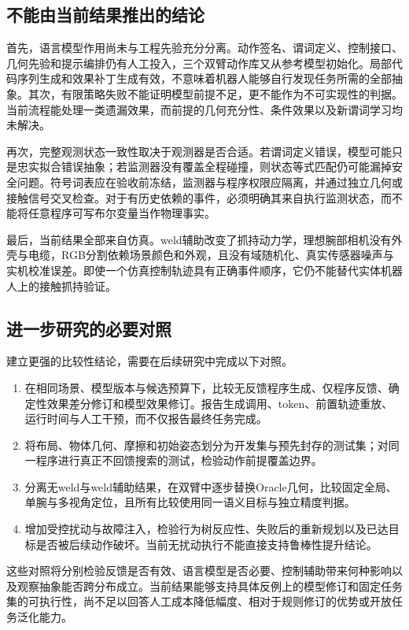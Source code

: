 \documentclass[UTF8,zihao=-4,fontset=fandol,a4paper]{ctexart}
\begin{document}
\subsection{不能由当前结果推出的结论}
首先，语言模型作用尚未与工程先验充分分离。动作签名、谓词定义、控制接口、几何先验和提示编排仍有人工投入，三个双臂动作库又从参考模型初始化。局部代码序列生成和效果补丁生成有效，不意味着机器人能够自行发现任务所需的全部抽象。其次，有限策略失败不能证明模型前提不足，更不能作为不可实现性的判据。当前流程能处理一类遗漏效果，而前提的几何充分性、条件效果以及新谓词学习均未解决。

再次，完整观测状态一致性取决于观测器是否合适。若谓词定义错误，模型可能只是忠实拟合错误抽象；若监测器没有覆盖全程碰撞，则状态等式匹配仍可能漏掉安全问题。符号词表应在验收前冻结，监测器与程序权限应隔离，并通过独立几何或接触信号交叉检查。对于有历史依赖的事件，必须明确其来自执行监测状态，而不能将任意程序可写布尔变量当作物理事实。

最后，当前结果全部来自仿真。weld辅助改变了抓持动力学，理想腕部相机没有外壳与电缆，RGB分割依赖场景颜色和外观，且没有域随机化、真实传感器噪声与实机校准误差。即使一个仿真控制轨迹具有正确事件顺序，它仍不能替代实体机器人上的接触抓持验证。

\subsection{进一步研究的必要对照}
建立更强的比较性结论，需要在后续研究中完成以下对照。
\begin{enumerate}
\item 在相同场景、模型版本与候选预算下，比较无反馈程序生成、仅程序反馈、确定性效果差分修订和模型效果修订。报告生成调用、token、前置轨迹重放、运行时间与人工干预，而不仅报告最终任务完成。
\item 将布局、物体几何、摩擦和初始姿态划分为开发集与预先封存的测试集；对同一程序进行真正不回馈搜索的测试，检验动作前提覆盖边界。
\item 分离无weld与weld辅助结果，在双臂中逐步替换Oracle几何，比较固定全局、单腕与多视角定位，且所有比较使用同一语义目标与独立精度判据。
\item 增加受控扰动与故障注入，检验行为树反应性、失败后的重新规划以及已达目标是否被后续动作破坏。当前无扰动执行不能直接支持鲁棒性提升结论。
\end{enumerate}

这些对照将分别检验反馈是否有效、语言模型是否必要、控制辅助带来何种影响以及观察抽象能否跨分布成立。当前结果能够支持具体反例上的模型修订和固定任务集的可执行性，尚不足以回答人工成本降低幅度、相对于规则修订的优势或开放任务泛化能力。
\end{document}
